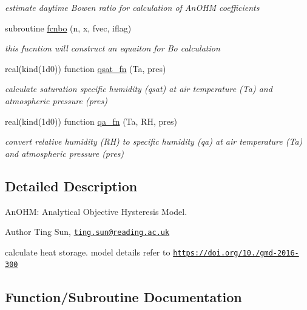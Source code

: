 \begin{DoxyCompactItemize}
\begin{DoxyCompactList}\small\item\em estimate daytime Bowen ratio for calculation of An\+O\+HM coefficients \end{DoxyCompactList}\item 
subroutine \hyperlink{namespaceanohm__module_a6111dd73f21e92071faa29d426ae84f9}{fcnbo} (n, x, fvec, iflag)
\begin{DoxyCompactList}\small\item\em this fucntion will construct an equaiton for Bo calculation \end{DoxyCompactList}\item 
real(kind(1d0)) function \hyperlink{namespaceanohm__module_a0db1439a632619dd005b69ce0fcb9cbe}{qsat\+\_\+fn} (Ta, pres)
\begin{DoxyCompactList}\small\item\em calculate saturation specific humidity (qsat) at air temperature (Ta) and atmospheric pressure (pres) \end{DoxyCompactList}\item 
real(kind(1d0)) function \hyperlink{namespaceanohm__module_ac9feb33254cb5595d19ad7f8a012ef92}{qa\+\_\+fn} (Ta, RH, pres)
\begin{DoxyCompactList}\small\item\em convert relative humidity (RH) to specific humidity (qa) at air temperature (Ta) and atmospheric pressure (pres) \end{DoxyCompactList}\end{DoxyCompactItemize}


\subsection{Detailed Description}
An\+O\+HM\+: Analytical Objective Hysteresis Model. 

\begin{DoxyAuthor}{Author}
Ting Sun, \href{mailto:ting.sun@reading.ac.uk}{\tt ting.\+sun@reading.\+ac.\+uk}
\end{DoxyAuthor}
calculate heat storage. model details refer to \href{https://doi.org/10.5194/gmd-2016-300}{\tt https\+://doi.\+org/10./gmd-\/2016-\/300} 

\subsection{Function/\+Subroutine Documentation}
\mbox{\label{namespaceanohm__module_a12150b343f1a4a8c3210e499cb9db9d9}} 
